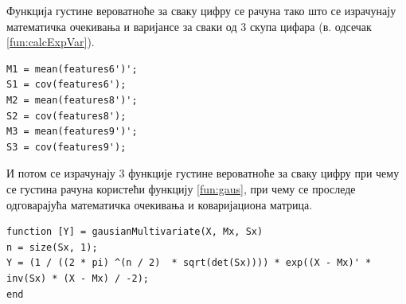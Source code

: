 Функција густине вероватноће за сваку цифру се рачуна тако што се израчунају математичка очекивања и варијансе за сваки од 3 скупа цифара (в. одсечак \ref{fun:calcExpVar}).

\begin{lstlisting}[caption={Варијансе и математичка очекивања},label={fun:calcExpVar}]
M1 = mean(features6')'; 
S1 = cov(features6');
M2 = mean(features8')'; 
S2 = cov(features8');
M3 = mean(features9')'; 
S3 = cov(features9');
\end{lstlisting}

И потом се израчунају 3 функције густине вероватноће за сваку цифру при чему се густина рачуна користећи функцију \ref{fun:gaus}, при чему се проследе одговарајућа математичка очекивања и коваријациона матрица.
\begin{lstlisting}[caption={Гаусова расподела},label={fun:gaus}]
function [Y] = gausianMultivariate(X, Mx, Sx)
n = size(Sx, 1);
Y = (1 / ((2 * pi) ^(n / 2)  * sqrt(det(Sx)))) * exp((X - Mx)' * inv(Sx) * (X - Mx) / -2);
end
\end{lstlisting}

